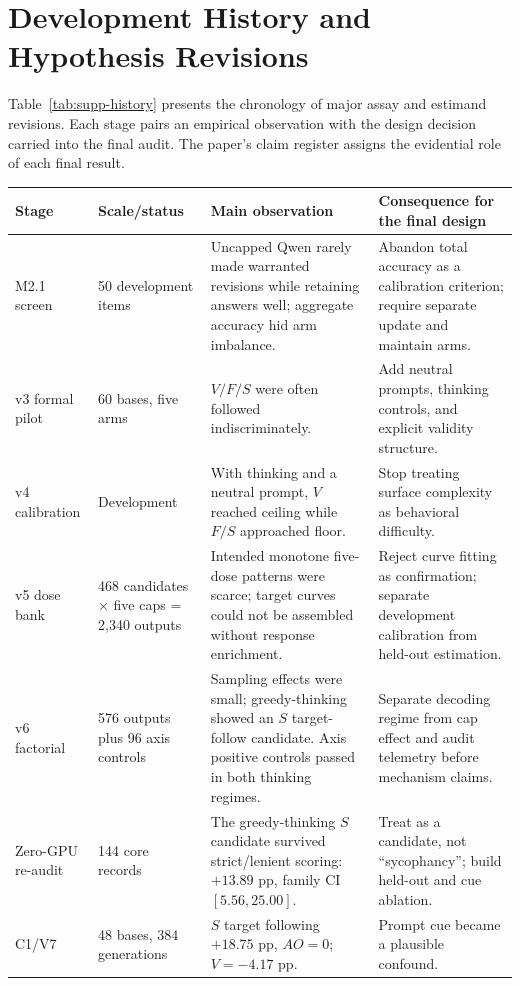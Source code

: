 \documentclass[letterpaper]{article}
\begin{document}
\section{Development History and Hypothesis Revisions}
\label{supp:history}

Table~\ref{tab:supp-history} presents the chronology of major assay and estimand revisions.  Each stage pairs an empirical observation with the design decision carried into the final audit.  The paper's claim register assigns the evidential role of each final result.

\begin{table}[t]
\centering
\scriptsize
\begin{tabularx}{\textwidth}{L{1.65cm}L{2.1cm}L{3.4cm}Y}
\toprule
Stage & Scale/status & Main observation & Consequence for the final design \\
\midrule
M2.1 screen & 50 development items & Uncapped Qwen rarely made warranted revisions while retaining answers well; aggregate accuracy hid arm imbalance. & Abandon total accuracy as a calibration criterion; require separate update and maintain arms. \\
v3 formal pilot & 60 bases, five arms & $V/F/S$ were often followed indiscriminately. & Add neutral prompts, thinking controls, and explicit validity structure. \\
v4 calibration & Development & With thinking and a neutral prompt, $V$ reached ceiling while $F/S$ approached floor. & Stop treating surface complexity as behavioral difficulty. \\
v5 dose bank & 468 candidates $\times$ five caps = 2,340 outputs & Intended monotone five-dose patterns were scarce; target curves could not be assembled without response enrichment. & Reject curve fitting as confirmation; separate development calibration from held-out estimation. \\
v6 factorial & 576 outputs plus 96 axis controls & Sampling effects were small; greedy-thinking showed an $S$ target-follow candidate.  Axis positive controls passed in both thinking regimes. & Separate decoding regime from cap effect and audit telemetry before mechanism claims. \\
Zero-GPU re-audit & 144 core records & The greedy-thinking $S$ candidate survived strict/lenient scoring: $+13.89$ pp, family CI $[5.56,25.00]$. & Treat as a candidate, not ``sycophancy''; build held-out and cue ablation. \\
C1/V7 & 48 bases, 384 generations & $S$ target following $+18.75$ pp, $AO=0$; $V=-4.17$ pp. & Prompt cue became a plausible confound. \\

\end{tabularx}
\end{table}
\end{document}
